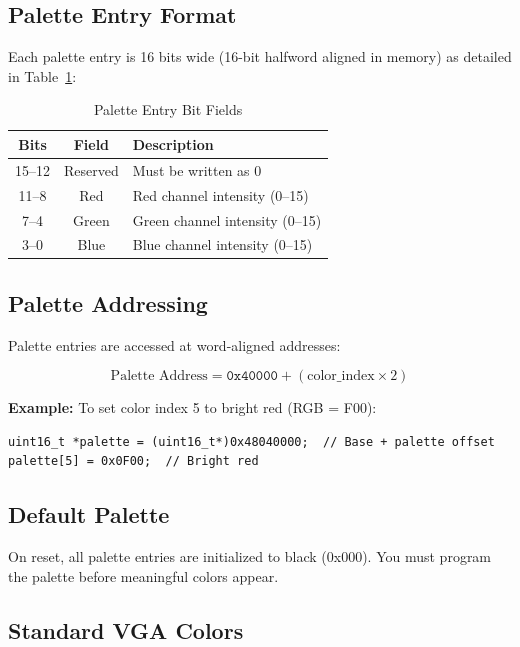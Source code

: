 \documentclass[11pt,letterpaper]{report}
\begin{document}
\subsection{Palette Entry Format}

Each palette entry is 16 bits wide (16-bit halfword aligned in memory) as detailed in Table~\ref{tab:palette_bits}:

\begin{table}[tbp]
\centering
\caption{Palette Entry Bit Fields}
\label{tab:palette_bits}
\begin{tabular}{ccp{6cm}}
\toprule
\textbf{Bits} & \textbf{Field} & \textbf{Description} \\
\midrule
15--12 & Reserved & Must be written as 0 \\
11--8 & Red & Red channel intensity (0--15) \\
7--4 & Green & Green channel intensity (0--15) \\
3--0 & Blue & Blue channel intensity (0--15) \\
\bottomrule
\end{tabular}
\end{table}

\subsection{Palette Addressing}

Palette entries are accessed at word-aligned addresses:

\begin{equation}
\text{Palette Address} = \texttt{0x40000} + (\text{color\_index} \times 2)
\end{equation}

\textbf{Example:} To set color index 5 to bright red (RGB = F00):

\begin{lstlisting}[style=c]
uint16_t *palette = (uint16_t*)0x48040000;  // Base + palette offset
palette[5] = 0x0F00;  // Bright red
\end{lstlisting}

\subsection{Default Palette}

On reset, all palette entries are initialized to black (0x000). You must program the palette before meaningful colors appear.

\subsection{Standard VGA Colors}
\end{document}
